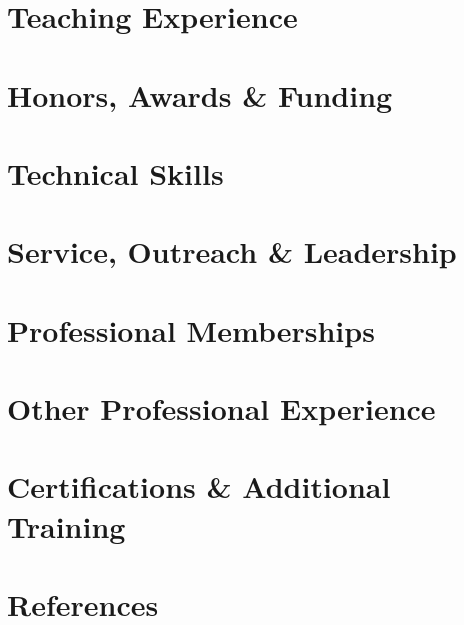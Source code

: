 \documentclass[10pt, letterpaper]{article}
\begin{document}
\section{Teaching Experience}
    \GuestLecturer
    \TeachingAssistant
    \OutreachEducator

\section{Honors, Awards \& Funding}
    \HonorThesisPrize
    \HonorTravelGrant
    \HonorFellowship

\section{Technical Skills}
    \SkillsTechnical

\section{Service, Outreach \& Leadership}
    \ServiceReviewer
    \ServiceOrganizer[short]    %
    \ServiceMentor

\section{Professional Memberships}
    \MemberTeachers
    \MemberSociety

\ifshort\else
\section{Other Professional Experience}
    \JobAnalyst
    \JobTutor
\fi

\section{Certifications \& Additional Training}
    \CertTeaching
    \CertComputing

\section{References}
    \RefRoe
    \RefSmith
\end{document}
